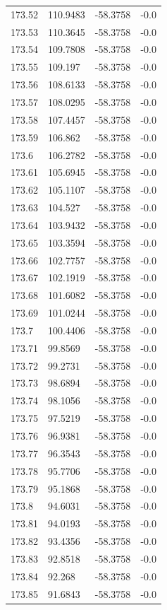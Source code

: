 \begin{table}[H]
\begin{tabular}{llll}
173.52 & 110.9483 & -58.3758 & -0.0 \\
173.53 & 110.3645 & -58.3758 & -0.0 \\
173.54 & 109.7808 & -58.3758 & -0.0 \\
173.55 & 109.197 & -58.3758 & -0.0 \\
173.56 & 108.6133 & -58.3758 & -0.0 \\
173.57 & 108.0295 & -58.3758 & -0.0 \\
173.58 & 107.4457 & -58.3758 & -0.0 \\
173.59 & 106.862 & -58.3758 & -0.0 \\
173.6 & 106.2782 & -58.3758 & -0.0 \\
173.61 & 105.6945 & -58.3758 & -0.0 \\
173.62 & 105.1107 & -58.3758 & -0.0 \\
173.63 & 104.527 & -58.3758 & -0.0 \\
173.64 & 103.9432 & -58.3758 & -0.0 \\
173.65 & 103.3594 & -58.3758 & -0.0 \\
173.66 & 102.7757 & -58.3758 & -0.0 \\
173.67 & 102.1919 & -58.3758 & -0.0 \\
173.68 & 101.6082 & -58.3758 & -0.0 \\
173.69 & 101.0244 & -58.3758 & -0.0 \\
173.7 & 100.4406 & -58.3758 & -0.0 \\
173.71 & 99.8569 & -58.3758 & -0.0 \\
173.72 & 99.2731 & -58.3758 & -0.0 \\
173.73 & 98.6894 & -58.3758 & -0.0 \\
173.74 & 98.1056 & -58.3758 & -0.0 \\
173.75 & 97.5219 & -58.3758 & -0.0 \\
173.76 & 96.9381 & -58.3758 & -0.0 \\
173.77 & 96.3543 & -58.3758 & -0.0 \\
173.78 & 95.7706 & -58.3758 & -0.0 \\
173.79 & 95.1868 & -58.3758 & -0.0 \\
173.8 & 94.6031 & -58.3758 & -0.0 \\
173.81 & 94.0193 & -58.3758 & -0.0 \\
173.82 & 93.4356 & -58.3758 & -0.0 \\
173.83 & 92.8518 & -58.3758 & -0.0 \\
173.84 & 92.268 & -58.3758 & -0.0 \\
173.85 & 91.6843 & -58.3758 & -0.0 \\

\end{tabular}
\end{table}
